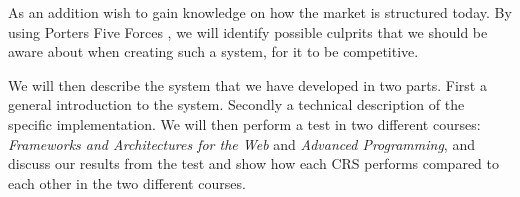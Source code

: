 As an addition wish to gain knowledge on how the market is structured today. By using Porters Five Forces \cite{porter2008five}, we will identify possible culprits that we should be aware about when creating such a system, for it to be competitive.

We will then describe the system that we have developed in two parts. First a general introduction to the system. Secondly a technical description of the specific implementation.
We will then perform a test in two different courses: \emph{Frameworks and Architectures for the Web} and \emph{Advanced Programming}, and discuss our results from the test and show how each CRS performs compared to each other in the two different courses.






